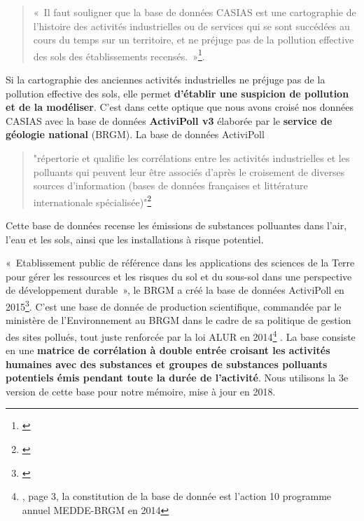 \documentclass[a4paper,twoside,12pt]{book}
\begin{document}
\begin{quote}
« Il faut souligner que la base de données CASIAS est une cartographie de l’histoire des activités industrielles ou de services qui se sont succédées au cours du temps sur un territoire, et ne préjuge pas de la pollution effective des sols des établissements recensés. »\footnote{\cite{brgm_casias_nodate}}. 
\end{quote}
Si la cartographie des anciennes activités industrielles ne préjuge pas de la pollution effective des sols, elle permet \textbf{d’établir une suspicion de pollution et de la modéliser}. C’est dans cette optique que nous avons croisé nos données CASIAS avec la base de données \textbf{ActiviPoll v3} élaborée par le \textbf{service de géologie national} (BRGM). La base de données ActiviPoll \begin{quote}"répertorie et qualifie les corrélations entre les activités industrielles et les polluants qui peuvent leur être associés d'après le croisement de diverses sources d'information (bases de données françaises et littérature internationale spécialisée)"\footnote{\cite{brgm_bd_nodate}}\end{quote} Cette base de données recense les émissions de substances polluantes dans l'air, l'eau et les sols, ainsi que les installations à risque potentiel. 

« Etablissement public de référence dans les applications des sciences de la Terre pour gérer les ressources et les risques du sol et du sous-sol dans une perspective de développement durable », le BRGM a créé la base de données ActiviPoll en 2015\footnote{\cite{brgm_bd_nodate}}. C'est une base de donnée de production scientifique, commandée par le ministère de l'Environnement au BRGM dans le cadre de sa politique de gestion des sites pollués, tout juste renforcée par la loi ALUR en 2014\footnote{\cite{aubert_n_elaboration_2014}, page 3, la constitution de la base de donnée est l'action 10 programme annuel MEDDE-BRGM en 2014} . La base consiste en une \textbf{matrice de corrélation à double entrée croisant les activités humaines avec des substances et groupes de substances polluants potentiels émis pendant toute la durée de l'activité}. Nous utilisons la 3e version de cette base pour notre mémoire, mise à jour en 2018. 
\end{document}
